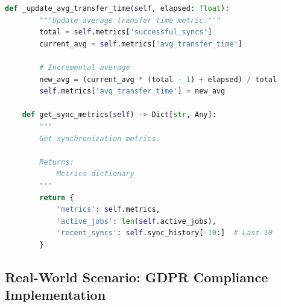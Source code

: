 \begin{lstlisting}[language=Python, caption={Cross-Cloud Synchronizer with Encryption}]
    def _update_avg_transfer_time(self, elapsed: float):
        """Update average transfer time metric."""
        total = self.metrics['successful_syncs']
        current_avg = self.metrics['avg_transfer_time']

        # Incremental average
        new_avg = (current_avg * (total - 1) + elapsed) / total
        self.metrics['avg_transfer_time'] = new_avg

    def get_sync_metrics(self) -> Dict[str, Any]:
        """
        Get synchronization metrics.

        Returns:
            Metrics dictionary
        """
        return {
            'metrics': self.metrics,
            'active_jobs': len(self.active_jobs),
            'recent_syncs': self.sync_history[-10:]  # Last 10
        }
\end{lstlisting}

\subsection{Real-World Scenario: GDPR Compliance Implementation}

